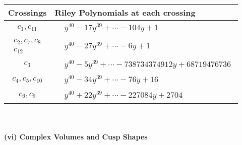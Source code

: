 \documentclass[1p]{elsarticle_modified}
\theoremstyle{definition}
\begin{document}
\begin{tabular}{m{50pt}|m{274pt}}
Crossings & \hspace{64pt}Riley Polynomials at each crossing \\
\hline $$\begin{aligned}c_{1},c_{11}\end{aligned}$$&$\begin{aligned}
&y^{40}-17 y^{39}+\cdots-104 y+1
\end{aligned}$\\
\hline $$\begin{aligned}c_{2},c_{7},c_{8}\\c_{12}\end{aligned}$$&$\begin{aligned}
&y^{40}-27 y^{39}+\cdots-6 y+1
\end{aligned}$\\
\hline $$\begin{aligned}c_{3}\end{aligned}$$&$\begin{aligned}
&y^{40}-5 y^{39}+\cdots-738734374912 y+68719476736
\end{aligned}$\\
\hline $$\begin{aligned}c_{4},c_{5},c_{10}\end{aligned}$$&$\begin{aligned}
&y^{40}-34 y^{39}+\cdots-76 y+16
\end{aligned}$\\
\hline $$\begin{aligned}c_{6},c_{9}\end{aligned}$$&$\begin{aligned}
&y^{40}+22 y^{39}+\cdots-227084 y+2704
\end{aligned}$\\
\hline
\end{tabular}\\~\\
\newpage\flushleft \textbf{(vi) Complex Volumes and Cusp Shapes}
\end{document}
